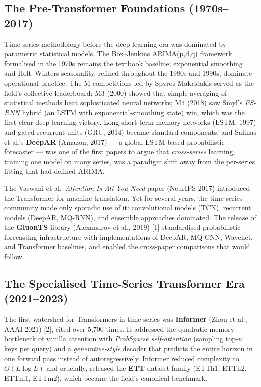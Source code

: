 \subsection{The Pre-Transformer Foundations (1970s--2017)}\label{the-pre-transformer-foundations-1970s2017}

Time-series methodology before the deep-learning era was dominated by parametric statistical models. The Box--Jenkins ARIMA(p,d,q) framework formalised in the 1970s remains the textbook baseline; exponential smoothing and Holt--Winters seasonality, refined throughout the 1980s and 1990s, dominate operational practice. The M-competitions led by Spyros Makridakis served as the field's collective leaderboard: M3 (2000) showed that simple averaging of statistical methods beat sophisticated neural networks; M4 (2018) saw Smyl's \emph{ES-RNN} hybrid (an LSTM with exponential-smoothing state) win, which was the first clear deep-learning victory. Long short-term memory networks (LSTM, 1997) and gated recurrent units (GRU, 2014) became standard components, and Salinas et al.'s \textbf{DeepAR} (Amazon, 2017) --- a global LSTM-based probabilistic forecaster --- was one of the first papers to argue that \emph{cross-series} learning, training one model on many series, was a paradigm shift away from the per-series fitting that had defined ARIMA.

The Vaswani et al.~\emph{Attention Is All You Need} paper (NeurIPS 2017) introduced the Transformer for machine translation. Yet for several years, the time-series community made only sporadic use of it: convolutional models (TCN), recurrent models (DeepAR, MQ-RNN), and ensemble approaches dominated. The release of the \textbf{GluonTS} library (Alexandrov et al., 2019) {[}1{]} standardised probabilistic forecasting infrastructure with implementations of DeepAR, MQ-CNN, Wavenet, and Transformer baselines, and enabled the cross-paper comparisons that would follow.

\subsection{The Specialised Time-Series Transformer Era (2021--2023)}\label{the-specialised-time-series-transformer-era-20212023}

The first watershed for Transformers in time series was \textbf{Informer} (Zhou et al., AAAI 2021) {[}2{]}, cited over 5,700 times. It addressed the quadratic memory bottleneck of vanilla attention with \emph{ProbSparse self-attention} (sampling top-\(u\) keys per query) and a \emph{generative-style} decoder that predicts the entire horizon in one forward pass instead of autoregressively. Informer reduced complexity to \(O(L \log L)\) and crucially, released the \textbf{ETT} dataset family (ETTh1, ETTh2, ETTm1, ETTm2), which became the field's canonical benchmark.

